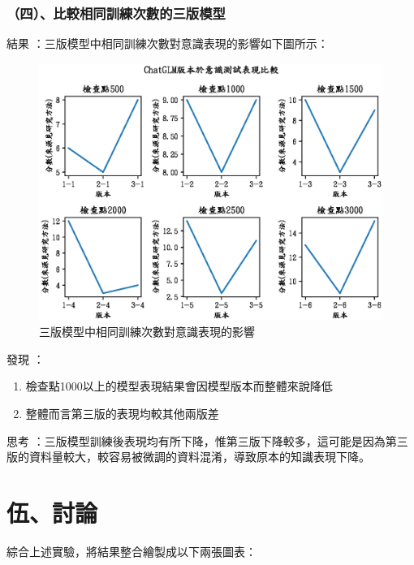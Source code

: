 \documentclass[12pt,a4paper,MingLiU,UTF8,natbib]{article}
\def\xeCJKembold{0.4}
\def\saveCJKnode{\dimen255\lastkern}
\def\restoreCJKnode{\kern-\dimen255\kern\dimen255}
\let\CJKoldsymbol\CJKsymbol
\let\CJKoldpunctsymbol\CJKpunctsymbol
\def\CJKfakeboldsymbol#1{%
	\special{pdf:literal direct 2 Tr \xeCJKembold\space w}%
	\CJKoldsymbol{#1}%
	\saveCJKnode
	\special{pdf:literal direct 0 Tr}%
	\restoreCJKnode}
\def\CJKfakeboldpunctsymbol#1{%
	\special{pdf:literal direct 2 Tr \xeCJKembold\space w}%
	\CJKoldpunctsymbol{#1}%
	\saveCJKnode
	\special{pdf:literal direct 0 Tr}%
	\restoreCJKnode}
\newcommand\CJKfakebold[1]{%
	\let\CJKsymbol\CJKfakeboldsymbol
	\let\CJKpunctsymbol\CJKfakeboldpunctsymbol
	#1%
	\let\CJKsymbol\CJKoldsymbol
	\let\CJKpunctsymbol\CJKoldpunctsymbol}
\begin{document}
\parbox{\textwidth}{
	
	\subsubsection{（四）、比較相同訓練次數的三版模型}
	\CJKfakebold{結果}：三版模型中相同訓練次數對意識表現的影響如下圖所示：
	
	\begin{figure}[H]
		\centering
		\includegraphics[width=.7\textwidth]{alltccomp}
		\caption{三版模型中相同訓練次數對意識表現的影響}
	\end{figure}
	
	\CJKfakebold{發現}：
	
	

	\begin{enumerate}
		\item 檢查點1000以上的模型表現結果會因模型版本而整體來說降低
		\item 整體而言第三版的表現均較其他兩版差
	\end{enumerate}



	\CJKfakebold{思考}：三版模型訓練後表現均有所下降，惟第三版下降較多，這可能是因為第三版的資料量較大，較容易被微調的資料混淆，導致原本的知識表現下降。
	
}

	\section{伍、討論}
	
	綜合上述實驗，將結果整合繪製成以下兩張圖表：
	
\end{document}
